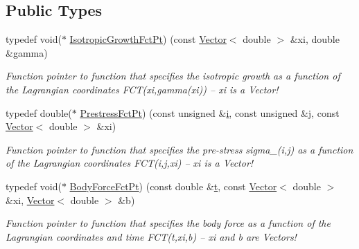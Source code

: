 \subsection*{Public Types}
\begin{DoxyCompactItemize}
\item 
typedef void($\ast$ \hyperlink{classoomph_1_1PVDEquationsBase_a59fc7069e0330c399ff53aebb6c67729}{Isotropic\+Growth\+Fct\+Pt}) (const \hyperlink{classoomph_1_1Vector}{Vector}$<$ double $>$ \&xi, double \&gamma)
\begin{DoxyCompactList}\small\item\em Function pointer to function that specifies the isotropic growth as a function of the Lagrangian coordinates F\+C\+T(xi,gamma(xi)) -- xi is a Vector! \end{DoxyCompactList}\item 
typedef double($\ast$ \hyperlink{classoomph_1_1PVDEquationsBase_a457b9ffb2b62ecc0cf5fe61cf28e98e5}{Prestress\+Fct\+Pt}) (const unsigned \&\hyperlink{cfortran_8h_adb50e893b86b3e55e751a42eab3cba82}{i}, const unsigned \&j, const \hyperlink{classoomph_1_1Vector}{Vector}$<$ double $>$ \&xi)
\begin{DoxyCompactList}\small\item\em Function pointer to function that specifies the pre-\/stress sigma\+\_(i,j) as a function of the Lagrangian coordinates F\+C\+T(i,j,xi) -- xi is a Vector! \end{DoxyCompactList}\item 
typedef void($\ast$ \hyperlink{classoomph_1_1PVDEquationsBase_aa0d7dc7279aff03dfcc3ad35bb6653be}{Body\+Force\+Fct\+Pt}) (const double \&\hyperlink{cfortran_8h_af6f0bd3dc13317f895c91323c25c2b8f}{t}, const \hyperlink{classoomph_1_1Vector}{Vector}$<$ double $>$ \&xi, \hyperlink{classoomph_1_1Vector}{Vector}$<$ double $>$ \&b)
\begin{DoxyCompactList}\small\item\em Function pointer to function that specifies the body force as a function of the Lagrangian coordinates and time F\+C\+T(t,xi,b) -- xi and b are Vectors! \end{DoxyCompactList}\end{DoxyCompactItemize}
